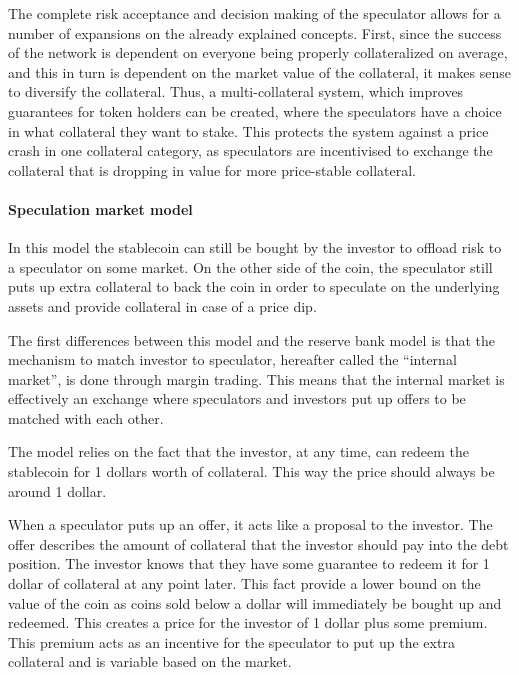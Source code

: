 \documentclass[english,]{IEEEtran}
\let\oldparagraph\paragraph
\renewcommand{\paragraph}[1]{\oldparagraph{#1}\mbox{}}
\begin{document}
The complete risk acceptance and decision making of the speculator
allows for a number of expansions on the already explained concepts.
First, since the success of the network is dependent on everyone being
properly collateralized on average, and this in turn is dependent on the
market value of the collateral, it makes sense to diversify the
collateral. Thus, a multi-collateral system, which improves guarantees
for token holders can be created, where the speculators have a choice in
what collateral they want to stake. This protects the system against a
price crash in one collateral category, as speculators are incentivised
to exchange the collateral that is dropping in value for more
price-stable collateral.

\paragraph{Speculation market model}\label{speculation-market-model}

In this model the stablecoin can still be bought by the investor to
offload risk to a speculator on some market. On the other side of the
coin, the speculator still puts up extra collateral to back the coin in
order to speculate on the underlying assets and provide collateral in
case of a price dip.

The first differences between this model and the reserve bank model is
that the mechanism to match investor to speculator, hereafter called the
``internal market'', is done through margin trading. This means that the
internal market is effectively an exchange where speculators and
investors put up offers to be matched with each other.

The model relies on the fact that the investor, at any time, can redeem
the stablecoin for 1 dollars worth of collateral. This way the price
should always be around 1 dollar.

When a speculator puts up an offer, it acts like a proposal to the
investor. The offer describes the amount of collateral that the investor
should pay into the debt position. The investor knows that they have
some guarantee to redeem it for 1 dollar of collateral at any point
later. This fact provide a lower bound on the value of the coin as coins
sold below a dollar will immediately be bought up and redeemed. This
creates a price for the investor of 1 dollar plus some premium. This
premium acts as an incentive for the speculator to put up the extra
collateral and is variable based on the market.
\end{document}

